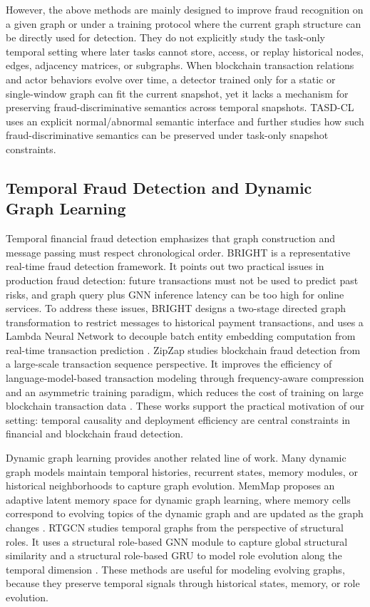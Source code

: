 However, the above methods are mainly designed to improve fraud recognition on a given graph or under a training protocol where the current graph structure can be directly used for detection. They do not explicitly study the task-only temporal setting where later tasks cannot store, access, or replay historical nodes, edges, adjacency matrices, or subgraphs. When blockchain transaction relations and actor behaviors evolve over time, a detector trained only for a static or single-window graph can fit the current snapshot, yet it lacks a mechanism for preserving fraud-discriminative semantics across temporal snapshots. TASD-CL uses an explicit normal/abnormal semantic interface and further studies how such fraud-discriminative semantics can be preserved under task-only snapshot constraints.

\subsection{Temporal Fraud Detection and Dynamic Graph Learning}
\label{subsec:rw-temporal-dynamic}

Temporal financial fraud detection emphasizes that graph construction and message passing must respect chronological order. BRIGHT is a representative real-time fraud detection framework. It points out two practical issues in production fraud detection: future transactions must not be used to predict past risks, and graph query plus GNN inference latency can be too high for online services. To address these issues, BRIGHT designs a two-stage directed graph transformation to restrict messages to historical payment transactions, and uses a Lambda Neural Network to decouple batch entity embedding computation from real-time transaction prediction \cite{lu2022bright}. ZipZap studies blockchain fraud detection from a large-scale transaction sequence perspective. It improves the efficiency of language-model-based transaction modeling through frequency-aware compression and an asymmetric training paradigm, which reduces the cost of training on large blockchain transaction data \cite{hu2024zipzap}. These works support the practical motivation of our setting: temporal causality and deployment efficiency are central constraints in financial and blockchain fraud detection.

Dynamic graph learning provides another related line of work. Many dynamic graph models maintain temporal histories, recurrent states, memory modules, or historical neighborhoods to capture graph evolution. MemMap proposes an adaptive latent memory space for dynamic graph learning, where memory cells correspond to evolving topics of the dynamic graph and are updated as the graph changes \cite{ji2024memmap}. RTGCN studies temporal graphs from the perspective of structural roles. It uses a structural role-based GNN module to capture global structural similarity and a structural role-based GRU to model role evolution along the temporal dimension \cite{du2024rtgcn}. These methods are useful for modeling evolving graphs, because they preserve temporal signals through historical states, memory, or role evolution.

